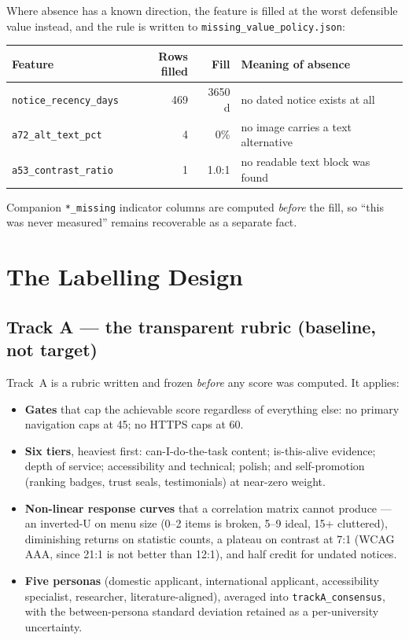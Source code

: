 \documentclass[11pt,a4paper]{article}
\begin{document}
\noindent Where absence has a known direction, the feature is filled at the worst defensible
value instead, and the rule is written to \texttt{missing\_value\_policy.json}:

\begin{table}[H]\centering\small
\begin{tabular}{lrrl}
\toprule
\textbf{Feature} & \textbf{Rows filled} & \textbf{Fill} & \textbf{Meaning of absence} \\
\midrule
\texttt{notice\_recency\_days} & 469 & 3650 d & no dated notice exists at all \\
\texttt{a72\_alt\_text\_pct}   & 4   & 0\%    & no image carries a text alternative \\
\texttt{a53\_contrast\_ratio}  & 1   & 1.0:1  & no readable text block was found \\
\bottomrule
\end{tabular}
\end{table}

\noindent Companion \texttt{*\_missing} indicator columns are computed \emph{before} the fill,
so ``this was never measured'' remains recoverable as a separate fact.

\section{The Labelling Design}

\subsection{Track A --- the transparent rubric (baseline, not target)}

Track~A is a rubric written and frozen \emph{before} any score was computed. It applies:

\begin{itemize}
\item \textbf{Gates} that cap the achievable score regardless of everything else: no primary
      navigation caps at 45; no HTTPS caps at 60.
\item \textbf{Six tiers}, heaviest first: can-I-do-the-task content; is-this-alive evidence;
      depth of service; accessibility and technical; polish; and self-promotion (ranking
      badges, trust seals, testimonials) at near-zero weight.
\item \textbf{Non-linear response curves} that a correlation matrix cannot produce --- an
      inverted-U on menu size (0--2 items is broken, 5--9 ideal, 15+ cluttered), diminishing
      returns on statistic counts, a plateau on contrast at 7:1 (WCAG AAA, since 21:1 is not
      better than 12:1), and half credit for undated notices.
\item \textbf{Five personas} (domestic applicant, international applicant, accessibility
      specialist, researcher, literature-aligned), averaged into \texttt{trackA\_consensus},
      with the between-persona standard deviation retained as a per-university uncertainty.
\end{itemize}
\end{document}
